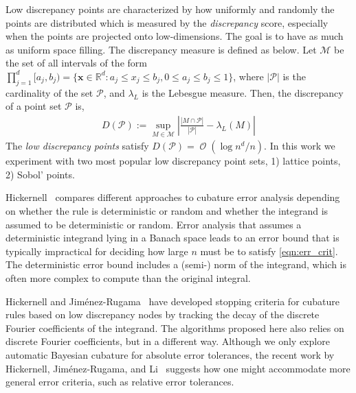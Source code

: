 \documentclass{iitthesis}          %
\DeclareMathOperator{\Order}{{\mathcal O}}
\newcommand{\bm}[1]{\boldsymbol{#1}}
\newcommand{\vx}{\bm{x}}
\def\abs#1{\ensuremath{\left \lvert #1 \right \rvert}}
\begin{document}
Low discrepancy points are characterized by how uniformly and randomly the points are distributed which is measured by the \emph{discrepancy} score, especially when the points are projected onto low-dimensions. The goal is to have as much as uniform space filling. The discrepancy measure is defined as below.
Let $\mathcal{M}$ be the set of all intervals of the form $\prod_{j=1}^{d} [a_j, b_j) = \{ \vx \in \mathbb{R}^d : a_j \le x_j \le b_j, 0 \le a_j \le b_j \le 1 \}$, where $\abs{\mathcal{P}}$ is the cardinality of the set $\mathcal{P}$, and $\lambda_L$ is the Lebesgue measure. Then, the discrepancy of a point set $\mathcal{P}$ is,
\begin{align*}
D(\mathcal{P}) := \sup_{M \in \mathcal{M}} 
\abs{ \frac{\abs{M \cap \mathcal{P}}}{\abs{\mathcal{P}}} - \lambda_L(M) }
\end{align*}
The \emph{low discrepancy points} satisfy $D(\mathcal{P}) = \Order(\log n^d/n)$.
In this work we experiment with two most popular low discrepancy point sets, 1) lattice points, 2) Sobol' points.


Hickernell~\cite{Hic17a} compares different approaches to cubature error analysis depending on whether the rule is deterministic or random and whether the integrand is assumed to be deterministic or random.  Error analysis that assumes a deterministic integrand lying in a Banach space leads to an error bound that is typically impractical for deciding how large $n$ must be to satisfy \eqref{eqn:err_crit}.  The deterministic error bound includes a (semi-) norm of the integrand, which is often more complex to compute than the original integral.

Hickernell and Jim\'enez-Rugama~\cite{HicJim16a,JimHic16a} have developed stopping criteria for cubature rules based on low discrepancy nodes by tracking the decay of the discrete Fourier coefficients of the integrand.  The algorithms proposed here also relies on discrete Fourier coefficients, but in a different way.  Although we only explore automatic Bayesian cubature for absolute error tolerances, the recent work by Hickernell, Jim\'enez-Rugama, and Li~\cite{HicEtal17a} suggests how one might accommodate more general error criteria, such as relative error tolerances.
\end{document}
